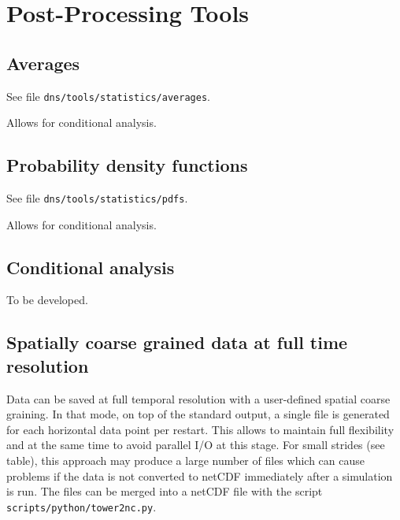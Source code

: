 \chapter{Post-Processing Tools}\label{sec:postprocessing}

\section{Averages}

See file {\tt dns/tools/statistics/averages}.

Allows for conditional analysis.

\section{Probability density functions}

See file {\tt dns/tools/statistics/pdfs}.

Allows for conditional analysis.

\section{Conditional analysis}

To be developed.

\section{Spatially coarse grained data at full time resolution}

Data can be saved at full temporal resolution with a user-defined spatial coarse graining. In that mode, on top of the standard output, a single file is generated for each horizontal  data point per restart. This allows to maintain full flexibility and at the same time to  avoid parallel I/O at this stage. 
% 
For small strides (see table), this approach may produce a large number of files which can cause problems if the data is not converted to netCDF immediately after a simulation is run. 
% 
The files can be merged into a netCDF file with the script \texttt{scripts/python/tower2nc.py}. 

